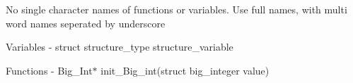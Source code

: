 No single character names of functions or variables. Use full names, with multi word names seperated by underscore \par
 Variables -\/ struct structure\-\_\-type structure\-\_\-variable \par
 Functions -\/ Big\-\_\-\-Int$\ast$ init\-\_\-\-Big\-\_\-int(struct big\-\_\-integer value) \par
 